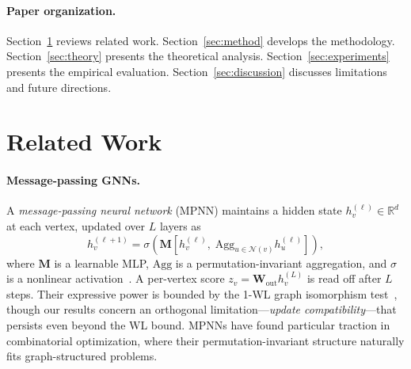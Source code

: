 \documentclass[11pt]{article}
\newcommand{\change}[1]{{\color{red}#1}}
\theoremstyle{plain}
\theoremstyle{definition}
\theoremstyle{remark}
\begin{document}
\paragraph{Paper organization.}
Section~\ref{sec:related} reviews related work. Section~\ref{sec:method} develops the
methodology. Section~\ref{sec:theory} presents the theoretical analysis.
Section~\ref{sec:experiments} presents the empirical evaluation.
Section~\ref{sec:discussion} discusses limitations and future directions.

\section{Related Work}
\label{sec:related}

\change{\paragraph{Message-passing GNNs.}
  A \emph{message-passing neural network} (MPNN) maintains a hidden state
  $h_v^{(\ell)} \in \mathbb{R}^d$ at each vertex, updated over $L$ layers as
  \[
    h_v^{(\ell+1)} = \sigma\!\left(\mathbf{M}\!\left[h_v^{(\ell)},\;
    \mathrm{Agg}_{u \in \mathcal{N}(v)} h_u^{(\ell)}\right]\right),
  \]
  where $\mathbf{M}$ is a learnable MLP, $\mathrm{Agg}$ is a permutation-invariant
  aggregation, and $\sigma$ is a nonlinear activation~\citep{xu2019}. A per-vertex
  score $z_v = \mathbf{W}_{\mathrm{out}} h_v^{(L)}$ is read off after $L$ steps.
  Their expressive power is bounded by the 1-WL graph isomorphism
  test~\citep{xu2019, morris2019}, though our results concern an orthogonal
  limitation---\emph{update compatibility}---that persists even beyond the WL bound.
  MPNNs have found particular traction in combinatorial optimization, where their
permutation-invariant structure naturally fits graph-structured problems.}
\end{document}
